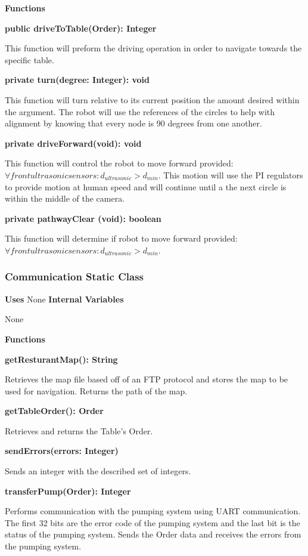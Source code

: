\documentclass [10pt]{article}
\begin{document}
\textbf{Functions}

\textbf{public driveToTable(Order): Integer}

This function will preform the driving operation in order to navigate towards the specific table.

\textbf{private turn(degree: Integer): void}

This function will turn relative to its current position the amount desired within the argument. The robot will use the references of the circles to help with alignment by knowing that every node is 90 degrees from one another.

\textbf{private driveForward(void): void}

This function will control the robot to move forward provided: $ \forall front ultrasonic sensors: d_{ultrasonic} > d_{min} $. This motion will use the PI regulators to provide motion at human speed and will continue until a the next circle is within the middle of the camera.

\textbf{private pathwayClear (void): boolean}

This function will determine if robot to move forward provided: $ \forall front ultrasonic sensors: d_{ultrasonic} > d_{min} $. 

\subsubsection{Communication Static Class}
\textbf{Uses}
None 
\textbf{Internal Variables}

None 

\textbf{Functions}

\textbf{getResturantMap(): String}

Retrieves the map file based off of an FTP protocol and stores the map to be used for navigation. Returns the path of the map.

\textbf{getTableOrder(): Order}

Retrieves and returns the Table's Order.

\textbf{sendErrors(errors: Integer)}

 Sends an integer with the described set of integers. 
 
\textbf{transferPump(Order): Integer}

 Performs communication with the pumping system using UART communication. The first 32 bits are the error code of the pumping system and the last bit is the status of the pumping system. Sends the Order data and receives the errors from the pumping system.
\end{document}
